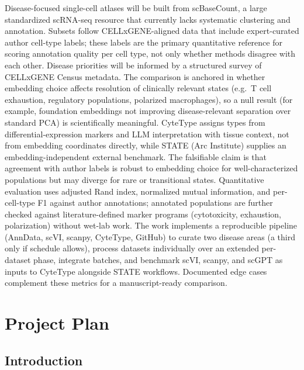 \documentclass[12pt,a4paper]{article}
\begin{document}
Disease-focused single-cell atlases will be built from scBaseCount, a large standardized scRNA-seq resource that currently lacks systematic clustering and annotation. Subsets follow CELLxGENE-aligned data that include expert-curated author cell-type labels; these labels are the primary quantitative reference for scoring annotation quality per cell type, not only whether methods disagree with each other. Disease priorities will be informed by a structured survey of CELLxGENE Census metadata. The comparison is anchored in whether embedding choice affects resolution of clinically relevant states (e.g.\ T cell exhaustion, regulatory populations, polarized macrophages), so a null result (for example, foundation embeddings not improving disease-relevant separation over standard PCA) is scientifically meaningful. CyteType assigns types from differential-expression markers and LLM interpretation with tissue context, not from embedding coordinates directly, while STATE (Arc Institute) supplies an embedding-independent external benchmark. The falsifiable claim is that agreement with author labels is robust to embedding choice for well-characterized populations but may diverge for rare or transitional states. Quantitative evaluation uses adjusted Rand index, normalized mutual information, and per-cell-type F1 against author annotations; annotated populations are further checked against literature-defined marker programs (cytotoxicity, exhaustion, polarization) without wet-lab work. The work implements a reproducible pipeline (AnnData, scVI, scanpy, CyteType, GitHub) to curate two disease areas (a third only if schedule allows), process datasets individually over an extended per-dataset phase, integrate batches, and benchmark scVI, scanpy, and scGPT as inputs to CyteType alongside STATE workflows. Documented edge cases complement these metrics for a manuscript-ready comparison.

\section*{Project Plan}

\subsection*{Introduction}
\end{document}
